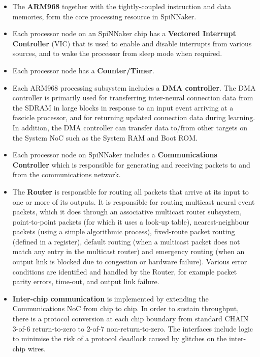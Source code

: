 \documentclass[a4paper, 11pt]{article}
\begin{document}
\begin{itemize}
	\setlength\itemsep{2pt}
	\item The \textbf{ARM968} together with the tightly-coupled instruction and data memories, form the core processing resource in SpiNNaker.
	\item Each processor node on an SpiNNaker chip has a \textbf{Vectored Interrupt Controller} (VIC) that is used to enable  and disable  interrupts  from  various  sources,  and  to wake  the processor  from  sleep mode when required.
	\item Each processor node has a \textbf{Counter/Timer}.
	\item Each ARM968 processing subsystem includes a \textbf{DMA controller}. The DMA controller is primarily used for transferring inter-neural connection data from the SDRAM in large blocks in response to an  input  event  arriving  at a  fascicle processor, and  for  returning updated connection data during learning. In addition, the DMA controller can transfer data to/from other targets on the System NoC such as the System RAM and Boot ROM.
	\item	Each processor node on SpiNNaker includes a \textbf{Communications Controller} which is responsible for generating and receiving packets to and from the communications network.
	\item The \textbf{Router} is responsible for routing all packets that arrive at its input to one or more of its outputs. It  is  responsible  for  routing multicast neural event packets, which  it does  through an associative multicast  router  subsystem,  point-to-point  packets  (for  which  it  uses  a  look-up  table),  nearest-neighbour packets  (using  a  simple  algorithmic process),  fixed-route packet  routing  (defined  in  a register), default routing (when a multicast packet does not match any entry in the multicast router) and emergency routing (when an output link is blocked due to congestion or hardware failure). Various error conditions are identified and handled by the Router, for example packet parity errors, time-out, and output link failure.
	\item \textbf{Inter-chip  communication}  is  implemented  by  extending  the Communications NoC  from  chip  to chip.  In  order  to  sustain  throughput,  there  is  a  protocol  conversion  at  each  chip  boundary  from standard CHAIN 3-of-6 return-to-zero to 2-of-7 non-return-to-zero. The interfaces include logic to minimise the risk of a protocol deadlock caused by glitches on the inter-chip wires.

\end{itemize}
\end{document}
